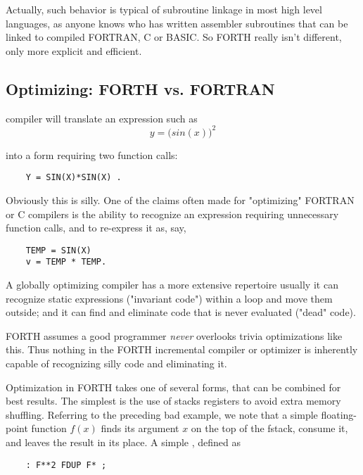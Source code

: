 Actually, such behavior is typical of subroutine linkage in most high
level languages, as anyone knows who has written assembler subroutines that can
be linked to compiled FORTRAN, C or BASIC.
So FORTH really isn't different, only more explicit and efficient.

\subsection{Optimizing: FORTH vs. FORTRAN}
compiler will translate an expression such as
\begin{equation}
     y=\Big( sin(x) \Big)^2\nonumber
\end{equation}

into a form requiring two function calls:

\begin{lstlisting}
    Y = SIN(X)*SIN(X) .
\end{lstlisting}

Obviously this is silly. One of the claims often made for "optimizing" FORTRAN or C compilers is the ability to recognize an expression requiring unnecessary function calls, and to re-express it as, say,
  
\begin{lstlisting}
    TEMP = SIN(X)
    v = TEMP * TEMP.
\end{lstlisting}

A globally optimizing compiler has a more extensive repertoire
usually it can recognize static expressions ("invariant code")
within a loop and move them outside; and it can find and eliminate code that is
never evaluated ("dead" code).

FORTH assumes a good programmer \textit{never} overlooks trivia
optimizations like this. Thus nothing in the FORTH incremental
compiler or optimizer is inherently capable of recognizing silly
code and eliminating it.

Optimization in FORTH takes one of several forms, that can be
combined for best results. The simplest is the use of stacks
registers to avoid extra memory shuffling. Referring to the
preceding bad example, we note that a simple floating-point
function $f(x)$ finds its argument $x$ on the top of the fstack, consume
it, and leaves the result in its place. A simple , defined as

\begin{lstlisting}
    : F**2 FDUP F* ;
\end{lstlisting}

